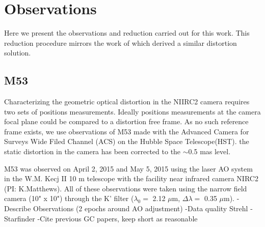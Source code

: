 \section{Observations}
Here we present the observations and reduction carried out for this work.  This reduction procedure mirrors the work of \cite{Yelda_2010} which derived a similar distortion solution.  
\subsection{M53}
Characterizing the geometric optical distortion in the NIIRC2 camera requires two sets of positions measurements.  Ideally positions measurements at the camera focal plane could be compared to a distortion free frame.  As no such reference frame exists, we use observations of M53 made with the Advanced Camera for Surveys Wide Filed Channel (ACS) on the Hubble Space Telescope(HST).  the static distortion in the camera has been corrected to the $\sim$0.5 mas level.

M53 was observed on April 2, 2015 and May 5, 2015 using the laser AO system in the W.M. Kecj II 10 m telescope with the facility near infrared camera NIRC2 (PI: K.Matthews).  All of these observations were taken using the narrow field camera (10" x 10") through the K' filter ($\lambda_{0} = $ 2.12 $\mu$m, $\Delta\lambda =$ 0.35 $\mu$m).
-Describe Observations (2 epochs around AO adjustment)
-Data quality Strehl
-Starfinder
-Cite previous GC papers, keep short as reasonable

